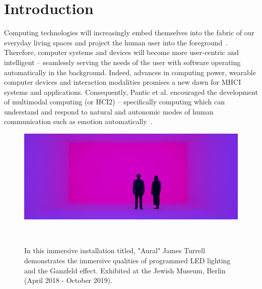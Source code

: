\documentclass{sigchi}
\begin{document}
\section{Introduction}

Computing technologies will increasingly embed themselves into the fabric of our everyday living spaces and project the human user into the foreground~\cite{6634207}. Therefore, computer systems and devices will become more user-centric and intelligent – seamlessly serving the needs of the user with software operating automatically in the background. Indeed, advances in computing power, wearable computer devices and interaction modalities promises a new dawn for MHCI systems and applications. Consequently, Pantic et al. encouraged the development of multimodal computing (or HCI2) – specifically computing which can understand and respond to natural and autonomic modes of human communication such as emotion automatically~\cite{pantic2008human, 6634207}.

\begin{figure}
  \centering
  \includegraphics[width=1.75\columnwidth]{figures/turrell}
  \caption{In this immersive installation titled, "Aural" James Turrell demonstrates the immersive qualities of programmed LED lighting and the Ganzfeld effect. Exhibited at the Jewish Museum, Berlin (April 2018 - October 2019).}~\label{fig:figure1}
\end{figure}
\end{document}
